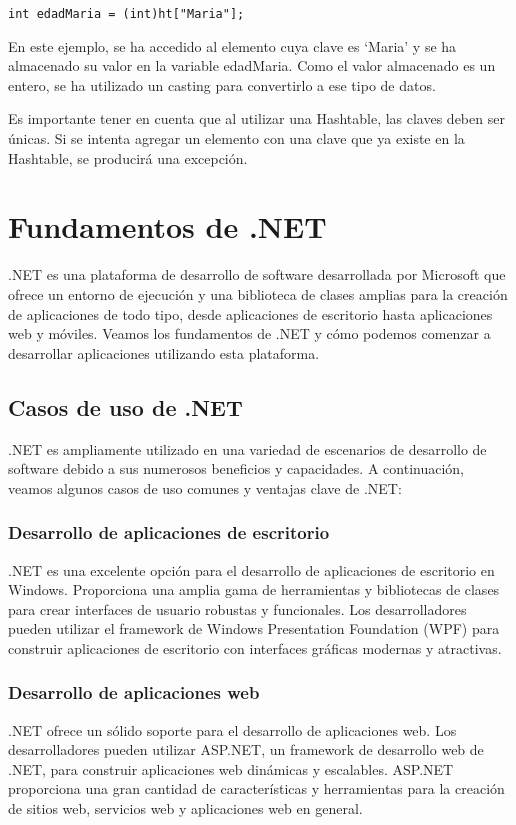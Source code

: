 \documentclass[executivepaper]{article}
\begin{document}
\begin{lstlisting}
int edadMaria = (int)ht["Maria"];
\end{lstlisting}

En este ejemplo, se ha accedido al elemento cuya clave es \enquote*{Maria} y se ha almacenado su valor en la variable edadMaria. Como el valor almacenado es un entero, se ha utilizado un casting para convertirlo a ese tipo de datos.

Es importante tener en cuenta que al utilizar una Hashtable, las claves deben ser únicas. Si se intenta agregar un elemento con una clave que ya existe en la Hashtable, se producirá una excepción.

\section{Fundamentos de .NET}
.NET es una plataforma de desarrollo de software desarrollada por Microsoft que ofrece un entorno de ejecución y una biblioteca de clases amplias para la creación de aplicaciones de todo tipo, desde aplicaciones de escritorio hasta aplicaciones web y móviles. Veamos los fundamentos de .NET y cómo podemos comenzar a desarrollar aplicaciones utilizando esta plataforma.

\subsection*{Casos de uso de .NET}
.NET es ampliamente utilizado en una variedad de escenarios de desarrollo de software debido a sus numerosos beneficios y capacidades. A continuación, veamos algunos casos de uso comunes y ventajas clave de .NET:

\subsubsection*{Desarrollo de aplicaciones de escritorio}
.NET es una excelente opción para el desarrollo de aplicaciones de escritorio en Windows. Proporciona una amplia gama de herramientas y bibliotecas de clases para crear interfaces de usuario robustas y funcionales. Los desarrolladores pueden utilizar el framework de Windows Presentation Foundation (WPF) para construir aplicaciones de escritorio con interfaces gráficas modernas y atractivas.

\subsubsection*{Desarrollo de aplicaciones web}
.NET ofrece un sólido soporte para el desarrollo de aplicaciones web. Los desarrolladores pueden utilizar ASP.NET, un framework de desarrollo web de .NET, para construir aplicaciones web dinámicas y escalables. ASP.NET proporciona una gran cantidad de características y herramientas para la creación de sitios web, servicios web y aplicaciones web en general.
\end{document}
